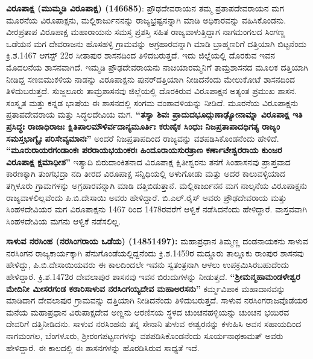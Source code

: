 \textbf{ವಿರೂಪಾಕ್ಷ (ಮುಮ್ಮಡಿ ವಿರೂಪಾಕ್ಷ) (146685)}: ಪ್ರೌಢದೇವರಾಯನ ತಮ್ಮ ಪ್ರತಾಪದೇವರಾಯನ ಮಗ ಮೂರನೆಯ ವಿರೂಪಾಕ್ಷನು, ಮಲ್ಲಿಕಾರ್ಜುನನನ್ನು ರಾಜ್ಯಭ್ರಷ್ಟನನ್ನಾಗಿ ಮಾಡಿ ಅಧಿಕಾರವನ್ನು ವಹಿಸಿಕೊಂಡನು. ವೀರಪ್ರತಾಪ ವಿರೂಪಾಕ್ಷ ಮಹಾರಾಯನು ಸಮಸ್ತ ಪ್ರಶಸ್ತಿ ಸಹಿತ ರಾಜ್ಯವಾಳುತ್ತಿದ್ದಾಗ ನಾಗಮಂಗಲದ ಸಿಂಗಣ್ಣ ಒಡೆಯನ ಮಗ ದೇವರಾಜನು ಹೊಸಹಳ್ಳಿ ಗ್ರಾಮವನ್ನು ಅಗ್ರಹಾರವನ್ನಾಗಿ ಮಾಡಿ ಬ್ರಾಹ್ಮಣರಿಗೆ ದತ್ತಿಯಾಗಿ ಬಿಟ್ಟನೆಂದು ಕ್ರಿ.ಶ.1467 ಆಗಸ್ಟ್​ 22ರ ಸೀತಾಪುರ ಶಾಸನದಿಂದ ತಿಳಿದಬರುತ್ತದೆ. ಇದು ಜಿಲ್ಲೆಯಲ್ಲಿ ದೊರಕುವ ಇವನ ಮೊದಲನೆಯ ಶಾಸನವಾಗಿದೆ. ಇಮ್ಮಡಿ ಪ್ರೌಢದೇವರಾಯನು ನಾಚಿಯಾರಮ್ಮನಿಗೆ ತಾಮ್ರಶಾಸನದ ಮೂಲಕ ದತ್ತಿಯಾಗಿ ನೀಡಿದ್ದ ಸಣಬಿಮುಕಳಿಯ ನಾಡನ್ನು ವಿರೂಪಾಕ್ಷನು ಪುನರ್​ದತ್ತಿಯಾಗಿ ನೀಡಿದನೆಂದು ಮೇಲುಕೋಟೆ ಶಾಸನದಿಂದ ತಿಳಿದುಬರುತ್ತದೆ. ಸುಜ್ಜಲೂರು ತಾಮ್ರಶಾಸನವು ಜಿಲ್ಲೆಯಲ್ಲಿ ದೊರಕಿರುವ ವಿರೂಪಾಕ್ಷನ ಅತ್ಯಂತ ಪ್ರಮುಖ ಶಾಸನ. ಸಂಸ್ಕೃತ ಮತ್ತು ಕನ್ನಡ ಭಾಷೆಯ ಈ ಶಾಸನದಲ್ಲಿ ಸಂಗಮ ವಂಶಾವಳಿಯನ್ನು ನೀಡಿದೆ. ಮೂರನೆಯ ವಿರೂಪಾಕ್ಷನು ಪ್ರತಾಪದೇವರಾಯ ಮತ್ತು ಸಿದ್ಧಲದೇವಿಯ ಮಗ. \textbf{“ತಸ್ಯಾ ಶಿವಃ ಪ್ರಾದುದಭೂದ್ಗುಣಾಢ್ಯೋನಾಮ್ನಾ ವಿರೂಪಾಕ್ಷ ಇತಿ ಪ್ರಸಿದ್ಧಃ ರಾಜಾಧಿರಾಜಃ ಕ್ಷಿತಿಪಾಲಮೌಳಿರ್ವದಾನ್ಯಮೂರ್ತಿಃ ಕರುಣೈಕ ಸಿಂಧುಃ ನಿಜಪ್ರತಾಪಾದಧಿಗತ್ಯ ರಾಜ್ಯಂ ಸಮಸ್ತಭಾಗ್ಯೈಃ ಪರಿಸೇವ್ಯಮಾನಃ”} ಅಂದರೆ ನಿಜಪ್ರತಾಪದಿಂದ ರಾಜ್ಯವನ್ನು ವಶಪಡಿಸಿಕೊಂಡನೆಂದು ಹೇಳಿದೆ. \textbf{“ಮೂರುರಾಯರಗಂಡಾಂಕಃ ಪರರಾಯಭಯಂಕರಃ ಹಿಂದೂರಾಯಸುರತ್ರಾಣ ಕರ್ಣಾಟೇಶ್ವರರಾಯ ಕುಂಜರ ವಿರೂಪಾಕ್ಷ ಕ್ಷಮಾಧೀಶ”} ಇತ್ಯಾದಿ ಬಿರುದಾಂಕಿತನಾದ ವಿರೂಪಾಕ್ಷ ಕ್ಷಿತೀಶ್ವರನು ತನಗೆ ಸಿಂಹಾಸನವು ಪ್ರಾಪ್ತವಾದ ಕಾರಣಕ್ಕಾಗಿ ತುಂಗಭದ್ರಾ ನದಿ ತೀರದ ವಿರೂಪಾಕ್ಷ ಸನ್ನಿಧಿಯಲ್ಲಿ ಆಳುಗೋಡು ಮತ್ತು ಅದರ ಕಾಲುವಳ್ಳಿಯಾದ ತಗ್ಗಿಳೂರು ಗ್ರಾಮಗಳನ್ನು ಅಗ್ರಹಾರವನ್ನಾಗಿ ಮಾಡಿ ದತ್ತಿಬಿಡುತ್ತಾನೆ. ಮಲ್ಲಿಕಾರ್ಜುನನ ಮಗ ನಾಲ್ಕನೆಯ ವಿರೂಪಾಕ್ಷನು ರಾಜ್ಯವಾಳಲಿಲ್ಲವೆಂದು ಪಿ.ಬಿ.ದೇಸಾಯಿ ಅವರು ಹೇಳಿದ್ದಾರೆ. ಬಿ.ಎಲ್​.ರೈಸ್​ ಅವರು ಪ್ರೌಢದೇವರಾಯ ಮತ್ತು ಸಿಂಹಳದೇವಿಯರ ಮಗ ವಿರೂಪಾಕ್ಷನು 1467 ರಿಂದ 1478ರವರೆಗೆ ಆಳ್ವಿಕೆ ನಡೆಸಿದನೆಂದು ಹೇಳಿದ್ದಾರೆ. ವಾಸ್ತವವಾಗಿ ಸಿಂಹಳದೇವಿಯ ಮಗನು ಆಳ್ವಿಕೆ ನಡೆಸಲಿಲ್ಲ.

\textbf{ಸಾಳುವ ನರಸಿಂಹ (ನರಸಿಂಗರಾಯ ಒಡೆಯ) (14851497):} ಮಹಾಪ್ರಧಾನ ತಿಮ್ಮಣ್ಣ ದಂಡನಾಯಕನು ಸಾಳುವ ನರಸಿಂಗನ ರಾಜ್ಯಕಾರ್ಯಕ್ಕಾಗಿ ಪೆನುಗೊಂಡೆಯಲ್ಲಿದ್ದನೆಂದು ಕ್ರಿ.ಶ.1459ರ ಮದ್ದೂರು ತಾಲ್ಲೂಕು ರಾಂಪುರ ಶಾಸನವು ಹೇಳಿದ್ದು, ಪಿ.ಬಿ.ದೇಸಾಯಿಯವರು ಈ ಕಾಲದಿಂದಲೇ ಇವನು ಸ್ವತಂತ್ರನಾಗಿ ಆಳಲು ಉಪಕ್ರಮಿಸಿರಬಹುದೆಂದು ಹೇಳಿದ್ದಾರೆ. ಕ್ರಿ.ಶ.1472ರ ದೇವಲಾಪುರ ಶಾಸನವು ಇವನ ಬಿರುದುಗಳನ್ನು ನೀಡುತ್ತದೆ. \textbf{“ಶ‍್ರೀಮನ್ಮಹಾಮಂಡಳೇಶ್ವರ ಮೇದಿನೀ ಮೀಸರಗಂಡ ಕಠಾರಿಸಾಳುವ ನರಸಿಂಗಯ್ಯದೇವ ಮಹಾಅರಸನು”} ಕರ್ಮ್ಮವಿಪಾಕ ಮಹಾದಾನವನ್ನು ಮಾಡಿದಾಗ ದೇವಲಾಪುರ ಗ್ರಾಮವನ್ನು ದತ್ತಿಯಾಗಿ ನೀಡಿದನೆಂದು ತಿಳಿದುಬರುತ್ತದೆ. ಸಾಳುವ ನರಸಿಂಗರಾಜವೊಡೆಯರ ಮನೆಯ ಮಹಾಪ್ರಧಾನ ವಿರುಪಾಕ್ಷದೇವ ಅಣ್ಣನು ಆರಣಿಸಯ ಸ್ಥಳದ ಚುಂಚನಹಳ್ಳಿಯನ್ನು ಚುಂಚನ ಭಯಿರವ ದೇವರಿಗೆ ದತ್ತಿ\break ನೀಡಿದನು. ಸಾಳುವ ನರಸಿಂಹನು ತನ್ನ ಸೇನಾನಿ ತುಳುವ ಈಶ್ವರನನ್ನು ಕಳುಹಿಸಿ ಅವನ ಸಹಾಯದಿಂದ ನಾಗಮಂಗಲ, ಬೆಂಗಳೂರು, ಶ‍್ರೀರಂಗಪಟ್ಟಣಗಳನ್ನು ವಶಪಡಿಸಿಕೊಂಡನೆಂದು ಸೂರ್ಯನಾಥಕಾಮತ್​ ಅವರು ಹೇಳಿದ್ದಾರೆ. ಈ ಕಾಲದಲ್ಲಿ ಈ ಶಾಸನಗಳನ್ನು ಹೊರಡಿಸಿರುವ ಸಾಧ್ಯತೆ ಇದೆ. 

